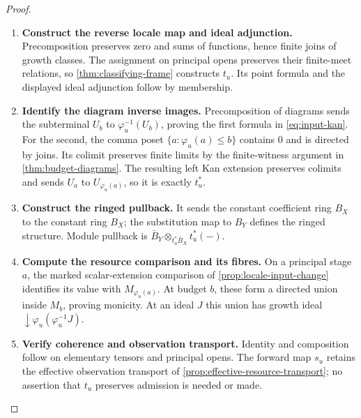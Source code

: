 \documentclass[11pt,a4paper]{article}
\numberwithin{algorithm}{section}
\numberwithin{equation}{section}
\theoremstyle{definition}
\theoremstyle{remark}
\theoremstyle{plain}
\theoremstyle{definition}
\theoremstyle{plain}
\begin{document}
\begin{proof}\leavevmode
\begin{enumerate}[leftmargin=*,align=left]
\item \textbf{Construct the reverse locale map and ideal adjunction.}
Precomposition preserves zero and sums of functions, hence finite
joins of growth classes. The assignment on principal opens
preserves their finite-meet relations, so
\cref{thm:classifying-frame} constructs $t_u$. Its point formula
and the displayed ideal adjunction follow by membership.

\item \textbf{Identify the diagram inverse images.}
Precomposition of diagrams sends the subterminal $U_b$ to
$\varphi_u^{-1}(U_b)$, proving the first formula in
\eqref{eq:input-kan}. For the second, the comma poset
$\{a:\varphi_u(a)\le b\}$ contains $0$ and is directed by
joins. Its colimit preserves finite limits by the finite-witness
argument in \cref{thm:budget-diagrams}. The resulting left Kan
extension preserves colimits and sends $U_a$ to
$U_{\varphi_u(a)}$, so it is exactly $t_u^*$.

\item \textbf{Construct the ringed pullback.}
It sends the constant coefficient ring $B_X$ to the constant
ring $B_X$; the substitution map to $B_Y$ defines the ringed
structure. Module pullback is
$\bar B_Y\otimes_{t_u^*\bar B_X}t_u^*(-)$.

\item \textbf{Compute the resource comparison and its fibres.}
On a principal stage $a$, the marked scalar-extension comparison
of \cref{prop:locale-input-change} identifies its value with
$M_{\varphi_u(a)}$. At budget $b$, these form a directed union
inside $M_b$, proving monicity. At an ideal $J$ this union has
growth ideal $\downarrow\varphi_u(\varphi_u^{-1}J)$.

\item \textbf{Verify coherence and observation transport.}
Identity and composition follow on elementary tensors and
principal opens. The forward map $s_u$ retains the effective
observation transport of \cref{prop:effective-resource-transport};
no assertion that $t_u$ preserves admission is needed or made.
\end{enumerate}
\end{proof}
\end{document}
